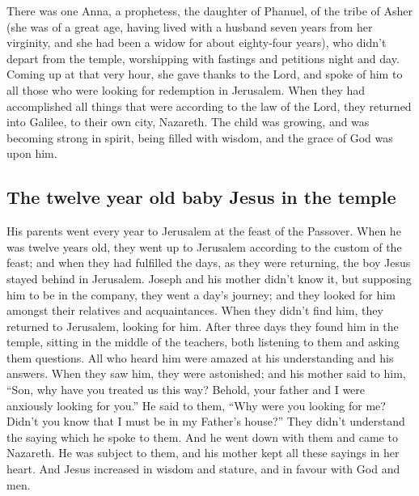  There was one Anna, a prophetess, the daughter of
Phanuel, of the tribe of Asher (she was of a great age, having lived
with a husband seven years from her virginity,  and she
had been a widow for about eighty-four years), who didn't depart from
the temple, worshipping with fastings and petitions night and day.
 Coming up at that very hour, she gave thanks to the
Lord, and spoke of him to all those who were looking for redemption in
Jerusalem.  When they had accomplished all things that
were according to the law of the Lord, they returned into Galilee, to
their own city, Nazareth.  The child was growing, and was
becoming strong in spirit, being filled with wisdom, and the grace of
God was upon him.

\hypertarget{the-twelve-year-old-baby-jesus-in-the-temple}{%
\subsection{The twelve year old baby Jesus in the
temple}\label{the-twelve-year-old-baby-jesus-in-the-temple}}

 His parents went every year to Jerusalem at the feast of
the Passover.  When he was twelve years old, they went up
to Jerusalem according to the custom of the feast;  and
when they had fulfilled the days, as they were returning, the boy Jesus
stayed behind in Jerusalem. Joseph and his mother didn't know it,
 but supposing him to be in the company, they went a
day's journey; and they looked for him amongst their relatives and
acquaintances.  When they didn't find him, they returned
to Jerusalem, looking for him.  After three days they
found him in the temple, sitting in the middle of the teachers, both
listening to them and asking them questions.  All who
heard him were amazed at his understanding and his answers.
 When they saw him, they were astonished; and his mother
said to him, ``Son, why have you treated us this way? Behold, your
father and I were anxiously looking for you.''  He said
to them, ``Why were you looking for me? Didn't you know that I must be
in my Father's house?''  They didn't understand the
saying which he spoke to them.  And he went down with
them and came to Nazareth. He was subject to them, and his mother kept
all these sayings in her heart.  And Jesus increased in
wisdom and stature, and in favour with God and men.

